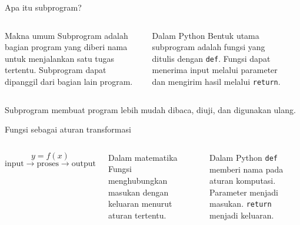 \documentclass[aspectratio=169,11pt]{beamer}
\begin{document}
\begin{frame}{Apa itu subprogram?}
\begin{columns}[T]
\begin{block}{Makna umum}
Subprogram adalah bagian program yang diberi nama untuk menjalankan satu tugas tertentu. Subprogram dapat dipanggil dari bagian lain program.
\end{block}
\begin{block}{Dalam Python}
Bentuk utama subprogram adalah fungsi yang ditulis dengan \texttt{def}. Fungsi dapat menerima input melalui parameter dan mengirim hasil melalui \texttt{return}.
\end{block}
\begin{center}
\end{center}
\end{columns}
\vspace{1mm}
\colorbox{LightTeal}{\parbox{.96\linewidth}{\small Subprogram membuat program lebih mudah dibaca, diuji, dan digunakan ulang.}}
\end{frame}

\begin{frame}{Fungsi sebagai aturan transformasi}
\begin{columns}[T]
\vspace{6mm}
\[
\boxed{y=f(x)}
\]
\[
\boxed{\text{input} \rightarrow \text{proses} \rightarrow \text{output}}
\]
\begin{block}{Dalam matematika}
Fungsi menghubungkan masukan dengan keluaran menurut aturan tertentu.
\end{block}
\begin{center}
\end{center}
\begin{block}{Dalam Python}
\texttt{def} memberi nama pada aturan komputasi. Parameter menjadi masukan. \texttt{return} menjadi keluaran.
\end{block}
\end{columns}
\end{frame}
\end{document}
